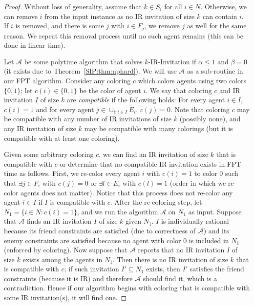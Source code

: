 \begin{proof}
	Without loss of generality, assume that $k\in S_i$ for all $i \in N$.
	Otherwise, we can remove $i$ from the input instance as no IR invitation of size $k$ can contain $i$. If $i$ is removed, and there is some $j$ with $i \in F_j$, we remove $j$ as well for the same reason. We repeat this removal process until no such agent remains (this can be done in linear time).

	Let $\mathcal{A}$ be some polytime algorithm that solves $k$-IR-Invitation if $\alpha \leq 1$ and $\beta = 0$ (it exists due to Theorem~\ref{SIP:thm:nphard}). We will use $\mathcal{A}$ as a sub-routine in our FPT algorithm. Consider any coloring $c$ which colors agents using two colors $\{0,1\}$; let $c(i) \in \{0,1\}$ be the color of agent $i$.
	We say that coloring $c$ and IR invitation $I$ of size $k$ are {\em compatible} if the following holds: For every agent $i\in I$, $c(i) = 1$ and for every agent $j \in \cup_{i: i\in I} E_i$, $c(j) = 0$. 
	Note that coloring $c$ may be compatible with any number of IR invitations of size $k$ (possibly none), and any IR invitation of size $k$ may be compatible with many colorings (but it is compatible with at least one coloring).
	
	Given some arbitrary coloring $c$, we can find an IR invitation of size $k$ that is compatible with $c$ or determine that no compatible IR invitation exists in FPT time as follows.
	First, we re-color every agent $i$ with $c(i)=1$ to color $0$ such that $\exists j\in F_i$ with $c(j)=0$ or $\exists l \in E_i$ with $c(l) = 1$ (order in which we re-color agents does not matter).
	Notice that this process does not re-color any agent $i\in I$ if $I$ is compatible with $c$. After the re-coloring step, let $N_1 = \{i\in N: c(i) = 1\}$, and we run the algorithm $\mathcal{A}$ on $N_1$ as input. Suppose that $\mathcal{A}$ finds an IR invitation $I$ of size $k$ given $N_1$. $I$ is individually rational because its friend constraints are satisfied (due to correctness of $\mathcal{A}$) and its enemy constraints are satisfied because no agent with color $0$ is included in $N_1$ (enforced by coloring). Now suppose that $\mathcal{A}$ reports that no IR invitation $I$ of size $k$ exists among the agents in $N_1$. Then there is no IR invitation of size $k$ that is compatible with $c$; if such invitation $I' \subseteq N_1$ exists, then $I'$ satisfies the friend constraints (because it is IR) and therefore $\mathcal{A}$ should find it, which is a contradiction. Hence if our algorithm begins with coloring that is compatible with some IR invitation(s), it will find one.


\end{proof}
